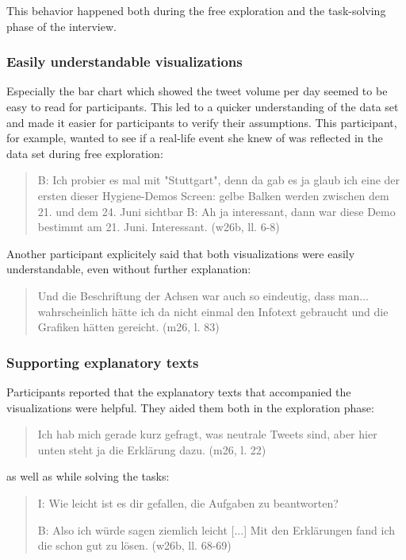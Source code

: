 This behavior happened both during the free exploration and the task-solving phase of the interview.

\subsubsection*{Easily understandable visualizations}
Especially the bar chart which showed the tweet volume per day seemed to be easy to read for participants. This led to a quicker understanding of the data set and made it easier for participants to verify their assumptions. This participant, for example, wanted to see if a real-life event she knew of was reflected in the data set during free exploration:

\begin{quote}
    B: Ich probier es mal mit "Stuttgart", denn da gab es ja glaub ich eine der ersten dieser Hygiene-Demos
    Screen: gelbe Balken werden zwischen dem 21. und dem 24. Juni sichtbar
    B: Ah ja interessant, dann war diese Demo bestimmt am 21. Juni. Interessant. (w26b, ll. 6-8)
\end{quote}

Another participant explicitely said that both visualizations were easily understandable, even without further explanation:

\begin{quote}
    Und die Beschriftung der Achsen war auch so eindeutig, dass man... wahrscheinlich hätte ich da nicht einmal den Infotext gebraucht und die Grafiken hätten gereicht. (m26, l. 83)
\end{quote}

\subsubsection*{Supporting explanatory texts}
Participants reported that the explanatory texts that accompanied the visualizations were helpful. They aided them both in the exploration phase:

\begin{quote}
    Ich hab mich gerade kurz gefragt, was neutrale Tweets sind, aber hier unten steht ja die Erklärung dazu. (m26, l. 22)
\end{quote}

as well as while solving the tasks:

\begin{quote}
    I: Wie leicht ist es dir gefallen, die Aufgaben zu beantworten?

    B: Also ich würde sagen ziemlich leicht [...] Mit den Erklärungen fand ich die schon gut zu lösen. (w26b, ll. 68-69)
\end{quote}

